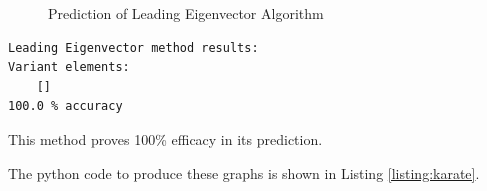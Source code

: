 \begin{figure}[h!]
\centering
{}
\caption{Prediction of Leading Eigenvector Algorithm}
\label{fig:graph_le}
\end{figure}

\begin{verbatim}
Leading Eigenvector method results: 
Variant elements:
	[]
100.0 % accuracy
\end{verbatim}

This method proves 100\% efficacy in its prediction.

\clearpage

The python code to produce these graphs is shown in Listing \ref{listing:karate}.


